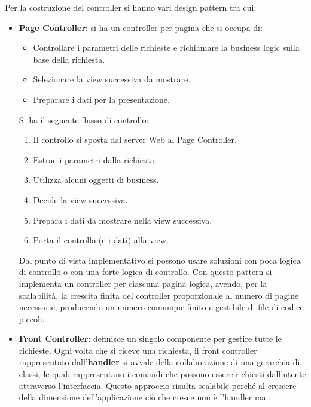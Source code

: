 Per la costruzione del controller si hanno vari design pattern tra cui:
\begin{itemize}
      \item \textbf{Page Controller}: si ha un controller per pagina che si
            occupa di:
            \begin{itemize}
                  \item Controllare i parametri delle richieste e richiamare la
                        business logic sulla base della richiesta.
                  \item Selezionare la view successiva da mostrare.
                  \item Preparare i dati per la presentazione.
            \end{itemize}
            Si ha il seguente flusso di controllo:
            \begin{enumerate}
                  \item Il controllo si sposta dal server Web al Page Controller.
                  \item Estrae i parametri dalla richiesta.
                  \item Utilizza alcuni oggetti di business.
                  \item Decide la view successiva.
                  \item Prepara i dati da mostrare nella view successiva.
                  \item Porta il controllo (e i dati) alla view.
            \end{enumerate}
            Dal punto di vista implementativo si possono usare soluzioni con poca
            logica di controllo o con una forte logica di controllo. Con questo
            pattern si implementa un controller per ciascuna pagina logica, avendo,
            per la scalabilità, la crescita finita del controller proporzionale
            al numero di pagine necessarie, producendo un numero comunque finito
            e gestibile di file di codice piccoli.
      \item \textbf{Front Controller}: definisce un singolo componente per gestire
            tutte le richieste. Ogni volta che si riceve una richiesta, il front
            controller rappresentato dall'\textbf{handler} si avvale della
            collaborazione di una gerarchia di classi, le quali rappresentano i
            comandi che possono essere richiesti dall'utente attraverso
            l'interfaccia. Questo approccio risulta scalabile perché al crescere
            della dimensione dell'applicazione ciò che cresce non è l'handler ma

\end{itemize}
